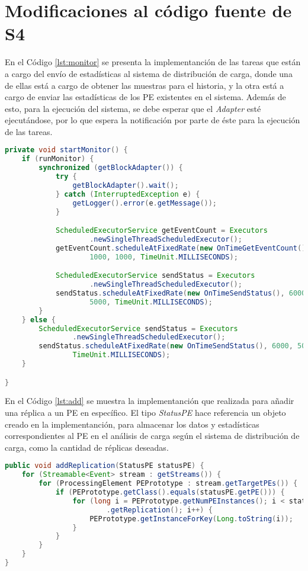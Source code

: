 \chapter{Modificaciones al código fuente de S4}
\label{apendice:codigoFuenteS4}

En el Código \ref{lst:monitor} se presenta la implementanción de las tareas que están a cargo del envío de estadísticas al sistema de distribución de carga, donde una de ellas está a cargo de obtener las muestras para el historia, y la otra está a cargo de enviar las estadísticas de los PE existentes en el sistema. Además de esto, para la ejecución del sistema, se debe esperar que el \textit{Adapter} esté ejecutándose, por lo que espera la notificación por parte de éste para la ejecución de las tareas.

\begin{lstlisting}[caption={Tareas que ejecutan el sistema de distribución de carga.},label={lst:monitor},language=Java]
private void startMonitor() {
	if (runMonitor) {
		synchronized (getBlockAdapter()) {
			try {
				getBlockAdapter().wait();
			} catch (InterruptedException e) {
				getLogger().error(e.getMessage());
			}

			ScheduledExecutorService getEventCount = Executors
					.newSingleThreadScheduledExecutor();
			getEventCount.scheduleAtFixedRate(new OnTimeGetEventCount(),
					1000, 1000, TimeUnit.MILLISECONDS);

			ScheduledExecutorService sendStatus = Executors
					.newSingleThreadScheduledExecutor();
			sendStatus.scheduleAtFixedRate(new OnTimeSendStatus(), 6000,
					5000, TimeUnit.MILLISECONDS);
		}
	} else {
		ScheduledExecutorService sendStatus = Executors
				.newSingleThreadScheduledExecutor();
		sendStatus.scheduleAtFixedRate(new OnTimeSendStatus(), 6000, 5000,
				TimeUnit.MILLISECONDS);
	}

}
\end{lstlisting}

En el Código \ref{lst:add} se muestra la implementanción que realizada para añadir una réplica a un PE en específico. El tipo \textit{StatusPE} hace referencia un objeto creado en la implementanción, para almacenar los datos y estadísticas correspondientes al PE en el análisis de carga según el sistema de distribución de carga, como la cantidad de réplicas deseadas.

\begin{lstlisting}[caption={Añadir r\'eplicas a un PE en S4.},label={lst:add},language=Java]
public void addReplication(StatusPE statusPE) {
	for (Streamable<Event> stream : getStreams()) {
		for (ProcessingElement PEPrototype : stream.getTargetPEs()) {
			if (PEPrototype.getClass().equals(statusPE.getPE())) {
				for (long i = PEPrototype.getNumPEInstances(); i < statusPE
						.getReplication(); i++) {
					PEPrototype.getInstanceForKey(Long.toString(i));
				}
			}
		}
	}
}
\end{lstlisting}

